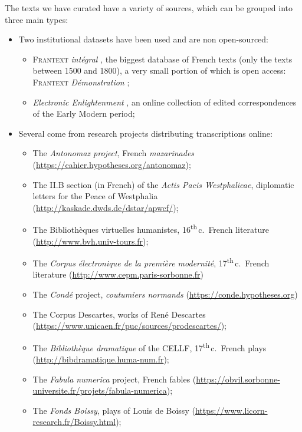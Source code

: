The texts we have curated have a variety of sources, which can be grouped into three main types:
\begin{itemize}
    \item Two institutional datasets have been used and are non open-sourced:
          \begin{itemize}
              \item \textsc{Frantext} \emph{intégral} \citep{atilf-1998-frantext}, the biggest database of French texts (only the texts between 1500 and 1800), a very small portion of which is open access: \textsc{Frantext} \emph{Démonstration} \citep{atilf-1998-frantext-d};
              \item \emph{Electronic Enlightenment} \citep{bodleian-2008-electronic}, an online collection of edited correspondences of the Early Modern period;
          \end{itemize}
    \item Several come from research projects distributing transcriptions online:
          \begin{itemize}
              \item The \emph{Antonomaz project},  French \emph{mazarinades} (\url{https://cahier.hypotheses.org/antonomaz});
              \item The II.B section (in French) of the \emph{Actis Pacis Westphalicae}, diplomatic letters for the Peace of Westphalia (\url{http://kaskade.dwds.de/dstar/apwcf/});
              \item The Bibliothèques virtuelles humanistes, 16\textsuperscript{th}\,c.~French literature (\url{http://www.bvh.univ-tours.fr});
              \item The \emph{Corpus électronique de la première modernité}, 17\textsuperscript{th}\,c.~French literature (\url{http://www.cepm.paris-sorbonne.fr})
              \item The \emph{Condé} project, \emph{coutumiers normands} (\url{https://conde.hypotheses.org})
              \item The Corpus Descartes, works of René Descartes (\url{https://www.unicaen.fr/puc/sources/prodescartes/});
              \item The \emph{Bibliothèque dramatique} of the CELLF, 17\textsuperscript{th}\,c.~French plays (\url{http://bibdramatique.huma-num.fr});
              \item The \emph{Fabula numerica} project, French fables (\url{https://obvil.sorbonne-universite.fr/projets/fabula-numerica});
              \item The \emph{ Fonds Boissy}, plays of Louis de Boissy (\url{https://www.licorn-research.fr/Boissy.html});

\end{itemize}
\end{itemize}
